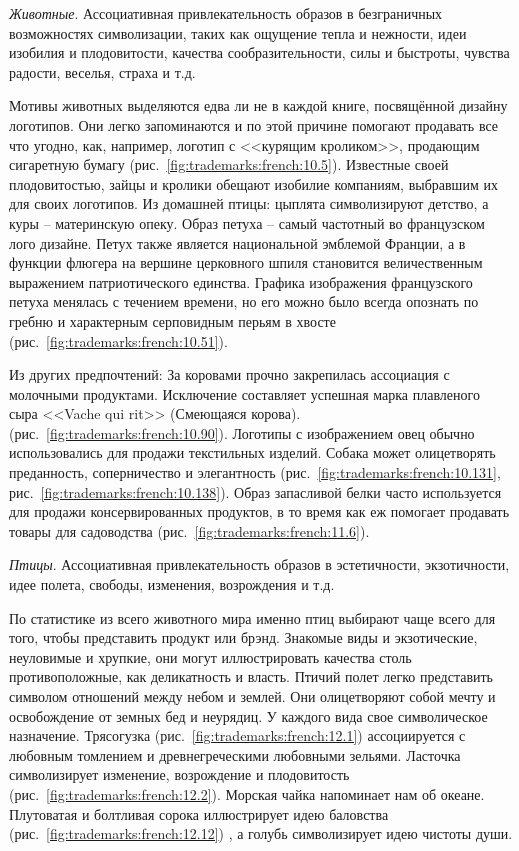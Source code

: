 \emph{Животные}. Ассоциативная привлекательность образов в безграничных
  возможностях символизации, таких как ощущение тепла и нежности, идеи изобилия и
  плодовитости, качества сообразительности, силы и быстроты, чувства радости,
  веселья, страха и т.д.

  Мотивы животных выделяются едва ли не в каждой книге, посвящённой дизайну
  логотипов. Они легко запоминаются и по этой причине помогают продавать все что
  угодно, как, например, логотип с <<курящим кроликом>>, продающим сигаретную бумагу
  (рис.~\ref{fig:trademarks:french:10.5}). Известные своей плодовитостью, зайцы и
  кролики обещают изобилие компаниям, выбравшим их для своих логотипов.  Из
  домашней птицы: цыплята символизируют детство, а куры -- материнскую опеку.
  Образ петуха -- самый частотный во французском лого дизайне. Петух также
  является национальной эмблемой Франции, а в функции флюгера на вершине
  церковного шпиля становится величественным выражением патриотического
  единства. Графика изображения французского петуха менялась с течением времени,
  но его можно было всегда опознать по гребню и характерным серповидным перьям в
  хвосте (рис.~\ref{fig:trademarks:french:10.51}).

  Из других предпочтений: За коровами прочно закрепилась ассоциация с молочными
  продуктами. Исключение составляет успешная марка плавленого сыра <<Vache qui
  rit>> (Смеющаяся корова). (рис.~\ref{fig:trademarks:french:10.90}). Логотипы с
  изображением овец обычно использовались для продажи текстильных изделий. Собака
  может олицетворять преданность, соперничество и элегантность
  (рис.~\ref{fig:trademarks:french:10.131},
  рис.~\ref{fig:trademarks:french:10.138}).  Образ запасливой белки часто
  используется для продажи консервированных продуктов, в то время как еж помогает
  продавать товары для садоводства (рис.~\ref{fig:trademarks:french:11.6}).
  
\emph{Птицы}. Ассоциативная привлекательность образов в эстетичности,
  экзотичности, идее полета, свободы, изменения, возрождения и т.д.

  По статистике из всего животного мира именно птиц выбирают чаще всего для
  того, чтобы представить продукт или брэнд. Знакомые виды и экзотические,
  неуловимые и хрупкие, они могут иллюстрировать качества столь противоположные,
  как деликатность и власть. Птичий полет легко представить символом отношений
  между небом и землей. Они олицетворяют собой мечту и освобождение от земных бед
  и неурядиц. У каждого вида свое символическое назначение.  Трясогузка
  (рис.~\ref{fig:trademarks:french:12.1}) ассоциируется с любовным томлением и
  древнегреческими любовными зельями. Ласточка символизирует изменение,
  возрождение и плодовитость (рис.~\ref{fig:trademarks:french:12.2}). Морская
  чайка напоминает нам об океане. Плутоватая и болтливая сорока иллюстрирует идею
  баловства (рис.~\ref{fig:trademarks:french:12.12}) , а голубь символизирует идею
  чистоты души.
  
